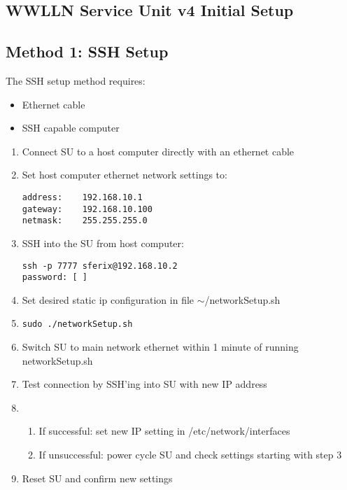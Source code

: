 \documentclass[12pt, letterpaper, onecolumn, oneside]{article}
\begin{document}
\begin{centering}
\section{WWLLN Service Unit v4 Initial Setup}

\end{centering}

\subsection*{Method 1: SSH Setup}
The SSH setup method requires:
\begin{itemize}
\item{Ethernet cable}
\item{SSH capable computer}
\end{itemize}

\begin{enumerate}
\item{Connect SU to a host computer directly with an ethernet cable}
\item{Set host computer ethernet network settings to:
\begin{verbatim}
address:	192.168.10.1
gateway:	192.168.10.100
netmask:	255.255.255.0
\end{verbatim}}
\item{SSH into the SU from host computer:
\begin{verbatim}
ssh -p 7777 sferix@192.168.10.2
password: [	]
\end{verbatim}}
\item{Set desired static ip configuration in file $\sim$/networkSetup.sh}
\item{\begin{verbatim}
sudo ./networkSetup.sh
\end{verbatim}}
\item{Switch SU to main network ethernet within 1 minute of running networkSetup.sh}
\item{Test connection by SSH'ing into SU with new IP address}
\item{
\begin{enumerate}
\item{If successful: set new IP setting in /etc/network/interfaces}
\item{If unsuccessful: power cycle SU and check settings starting with step 3}
\end{enumerate}}
\item{Reset SU and confirm new settings}
\end{enumerate}
\end{document}
